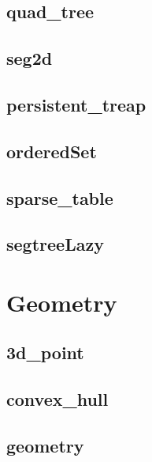 \subsection{quad_tree}
\raggedbottom
\hrulefill
\subsection{seg2d}
\raggedbottom
\hrulefill
\subsection{persistent_treap}
\raggedbottom
\hrulefill
\subsection{orderedSet}
\raggedbottom
\hrulefill
\subsection{sparse_table}
\raggedbottom
\hrulefill
\subsection{segtreeLazy}
\raggedbottom
\hrulefill

\section{Geometry}
\subsection{3d_point}
\raggedbottom
\hrulefill
\subsection{convex_hull}
\raggedbottom
\hrulefill
\subsection{geometry}
\raggedbottom
\hrulefill
